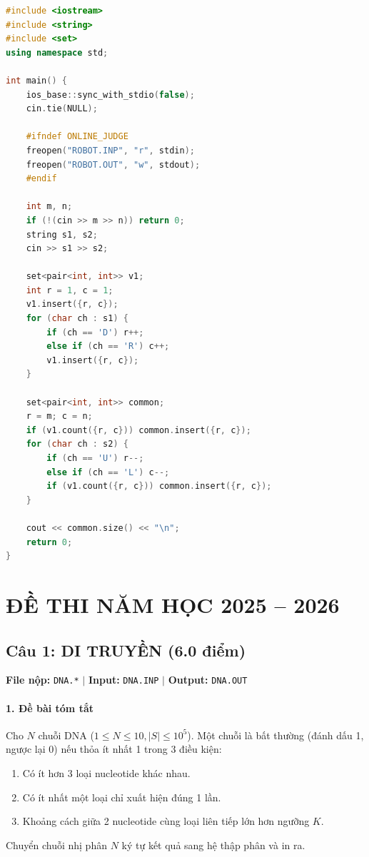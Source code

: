 \documentclass[11pt,a4paper]{article}
\begin{document}
\begin{lstlisting}[language=C++]
#include <iostream>
#include <string>
#include <set>
using namespace std;

int main() {
    ios_base::sync_with_stdio(false);
    cin.tie(NULL);

    #ifndef ONLINE_JUDGE
    freopen("ROBOT.INP", "r", stdin);
    freopen("ROBOT.OUT", "w", stdout);
    #endif

    int m, n;
    if (!(cin >> m >> n)) return 0;
    string s1, s2;
    cin >> s1 >> s2;

    set<pair<int, int>> v1;
    int r = 1, c = 1;
    v1.insert({r, c});
    for (char ch : s1) {
        if (ch == 'D') r++;
        else if (ch == 'R') c++;
        v1.insert({r, c});
    }

    set<pair<int, int>> common;
    r = m; c = n;
    if (v1.count({r, c})) common.insert({r, c});
    for (char ch : s2) {
        if (ch == 'U') r--;
        else if (ch == 'L') c--;
        if (v1.count({r, c})) common.insert({r, c});
    }

    cout << common.size() << "\n";
    return 0;
}
\end{lstlisting}

\newpage

\section{ĐỀ THI NĂM HỌC 2025 -- 2026}

\subsection{Câu 1: DI TRUYỀN (6.0 điểm)}
\textbf{File nộp:} \texttt{DNA.*} $\vert$ \textbf{Input:} \texttt{DNA.INP} $\vert$ \textbf{Output:} \texttt{DNA.OUT}

\paragraph{1. Đề bài tóm tắt}
Cho $N$ chuỗi DNA ($1 \le N \le 10, |S| \le 10^5$). Một chuỗi là bất thường (đánh dấu 1, ngược lại 0) nếu thỏa ít nhất 1 trong 3 điều kiện:
\begin{enumerate}
    \item Có ít hơn 3 loại nucleotide khác nhau.
    \item Có ít nhất một loại chỉ xuất hiện đúng 1 lần.
    \item Khoảng cách giữa 2 nucleotide cùng loại liên tiếp lớn hơn ngưỡng $K$.
\end{enumerate}
Chuyển chuỗi nhị phân $N$ ký tự kết quả sang hệ thập phân và in ra.
\end{document}
